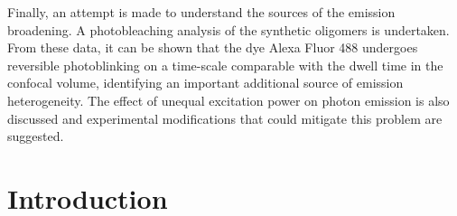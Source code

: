 Finally, an attempt is made to understand the sources of the emission broadening. A photobleaching analysis of the synthetic oligomers is undertaken. From these data, it can be shown that the dye Alexa Fluor 488 undergoes reversible photoblinking on a time-scale comparable with the dwell time in the confocal volume, identifying an important additional source of emission heterogeneity. The effect of unequal excitation power on photon emission is also discussed and experimental modifications that could mitigate this problem are suggested. 

%



\section{Introduction}
